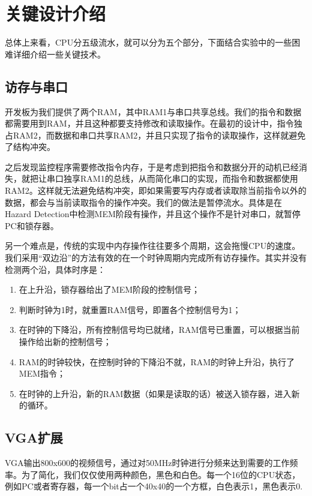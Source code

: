 \documentclass{article}
\begin{document}

\section{关键设计介绍} %
\label{sec:关键设计介绍}

总体上来看，CPU分五级流水，就可以分为五个部分，下面结合实验中的一些困难详细介绍一些关键技术。

\subsection{访存与串口}
开发板为我们提供了两个RAM，其中RAM1与串口共享总线。我们的指令和数据都需要用到RAM，并且这种都要支持修改和读取操作。在最初的设计中，指令独占RAM2，而数据和串口共享RAM2，并且只实现了指令的读取操作，这样就避免了结构冲突。

之后发现监控程序需要修改指令内存，于是考虑到把指令和数据分开的动机已经消失，就把让串口独享RAM1的总线，从而简化串口的实现，而指令和数据都使用RAM2。这样就无法避免结构冲突，即如果需要写内存或者读取除当前指令以外的数据，都会与当前读取指令的操作冲突。我们的做法是暂停流水。具体是在Hazard Detection中检测MEM阶段有操作，并且这个操作不是针对串口，就暂停PC和锁存器。

另一个难点是，传统的实现中内存操作往往要多个周期，这会拖慢CPU的速度。我们采用“双边沿”的方法有效的在一个时钟周期内完成所有访存操作。其实并没有检测两个沿，具体时序是：

\begin{enumerate}
	\item 在上升沿，锁存器给出了MEM阶段的控制信号；
	\item 判断时钟为1时，就重置RAM信号，即置各个控制信号为1；
	\item 在时钟的下降沿，所有控制信号均已就绪，RAM信号已重置，可以根据当前操作给出新的控制信号；
	\item RAM的时钟较快，在控制时钟的下降沿不就，RAM的时钟上升沿，执行了MEM指令；
	\item 在时钟的上升沿，新的RAM数据（如果是读取的话）被送入锁存器，进入新的循环。
\end{enumerate}

\subsection{VGA扩展} %
VGA输出800x600的视频信号，通过对50MHz时钟进行分频来达到需要的工作频率。为了简化，我们仅仅使用两种颜色，黑色和白色。每一个16位的CPU状态，例如PC或者寄存器，每一个bit占一个40x40的一个方框，白色表示1，黑色表示0.
\end{document}
